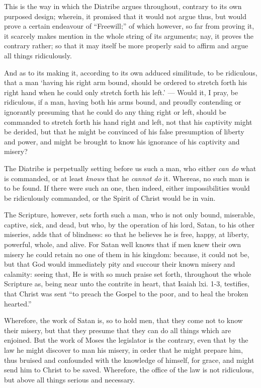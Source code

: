This is the way in which the Diatribe argues throughout, contrary to its own purposed design; wherein, it promised that it would not argue thus, but would prove a certain endeavour of “Freewill;” of which however, so far from proving it, it scarcely makes mention in the whole string of its arguments; nay, it proves the contrary rather; so that it may itself be more properly said to affirm and argue all things ridiculously.

And as to its making it, according to its own adduced similitude, to be ridiculous, that a man ‘having his right arm bound, should be ordered to stretch forth his right hand when he could only stretch forth his left.’ — Would it, I pray, be ridiculous, if a man, having both his arms bound, and proudly contending or ignorantly presuming that he could do any thing right or left, should be commanded to stretch forth his hand right and left, not that his captivity might be derided, but that he might be convinced of his false presumption of liberty and power, and might be brought to know his ignorance of his captivity and misery?

The Diatribe is perpetually setting before us such a man, who either \emph{can do }what is commanded, or at least \emph{knows }that he \emph{cannot do }it. Whereas, no such man is to be found. If there were such an one, then indeed, either impossibilities would be ridiculously commanded, or the Spirit of Christ would be in vain.

The Scripture, however, sets forth such a man, who is not only bound, miserable, captive, sick, and dead, but who, by the operation of his lord, Satan, to his other miseries, adds that of blindness: so that he believes he is free, happy, at liberty, powerful, whole, and alive. For Satan well knows that if men knew their own misery he could retain no one of them in his kingdom: because, it could not be, but that God would immediately pity and succour their known misery and calamity: seeing that, He is with so much praise set forth, throughout the whole Scripture as, being near unto the contrite in heart, that Isaiah lxi. 1-3, testifies, that Christ was sent “to preach the Gospel to the poor, and to heal the broken hearted.”

Wherefore, the work of Satan is, so to hold men, that they come not to know their misery, but that they presume that they can do all things which are enjoined. But the work of Moses the legislator is the contrary, even that by the law he might discover to man his misery, in order that he might prepare him, thus bruised and confounded with the knowledge of himself, for grace, and might send him to Christ to be saved. Wherefore, the office of the law is not ridiculous, but above all things serious and necessary.

